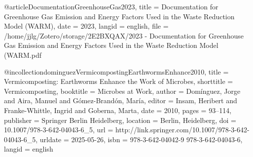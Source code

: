 {{{@article{DocumentationGreenhouseGas2023,
  title = {Documentation for {{Greenhouse Gas Emission}} and {{Energy Factors Used}} in the {{Waste Reduction Model}} ({{WARM}})},
  date = {2023},
  langid = {english},
  file = {/home/jjlg/Zotero/storage/2E2BXQAX/2023 - Documentation for Greenhouse Gas Emission and Energy Factors Used in the Waste Reduction Model (WARM.pdf}
}

@incollection{dominguezVermicompostingEarthwormsEnhance2010,
  title = {Vermicomposting: {{Earthworms Enhance}} the {{Work}} of {{Microbes}}},
  shorttitle = {Vermicomposting},
  booktitle = {Microbes at {{Work}}},
  author = {Domínguez, Jorge and Aira, Manuel and Gómez-Brandón, María},
  editor = {Insam, Heribert and Franke-Whittle, Ingrid and Goberna, Marta},
  date = {2010},
  pages = {93--114},
  publisher = {Springer Berlin Heidelberg},
  location = {Berlin, Heidelberg},
  doi = {10.1007/978-3-642-04043-6_5},
  url = {http://link.springer.com/10.1007/978-3-642-04043-6_5},
  urldate = {2025-05-26},
  isbn = {978-3-642-04042-9 978-3-642-04043-6},
  langid = {english}
}

}}}
